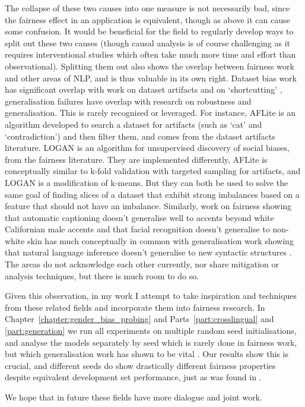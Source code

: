 The collapse of these two causes into one measure is not necessarily bad, since the fairness effect in an application is equivalent, though as above it can cause some confusion. It would be beneficial for the field to regularly develop ways to split out these two causes (though causal analysis is of course challenging as it requires interventional studies which often take much more time and effort than observational). Splitting them out also shows the overlap between fairness work and other areas of NLP, and is thus valuable in its own right. Dataset bias work has significant overlap with work on dataset artifacts and on `shortcutting' \citep{geirhos2020shortcut}, generalisation failures have overlap with research on robustness and generalisation. This is rarely recognised or leveraged. For instance, AFLite is an algorithm developed to search a dataset for artifacts (such as `cat' and `contradiction') \citep{LeBras2020AdversarialFO} and then filter them, and comes from the dataset artifacts literature. LOGAN \citep{zhao-chang-2020-logan} is an algorithm for unsupervised discovery of social biases, from the fairness literature. They are implemented differently, AFLite is conceptually similar to k-fold validation with targeted sampling for artifacts, and LOGAN is a modification of k-means. But they can both be used to solve the same goal of finding slices of a dataset that exhibit strong imbalances based on a feature that should not have an imbalance.  Similarly, work on fairness showing that automatic captioning doesn't generalise well to accents beyond white Californian male accents \citep{tatman17_interspeech} and that facial recognition doesn't generalise to non-white skin \citep{buolamwini18a} has much conceptually in common with generalisation work showing that natural language inference doesn't generalise to new syntactic structures \citep{mccoy-etal-2020-berts}. The areas do not acknowledge each other currently, nor share mitigation or analysis techniques, but there is much room to do so.

Given this observation, in my work I attempt to take inspiration and techniques from these related fields and incorporate them into fairness research. In Chapter~\ref{chapter:gender_bias_probing} and Parts~\ref{part:crosslingual} and \ref{part:generation} we run all experiments on multiple random seed initialisations, and analyse the models separately by seed which is rarely done in fairness work, but which generalisation work has shown to be vital \citep{mccoy-etal-2020-berts, multiberts}. Our results show this is crucial, and different seeds do show drastically different fairness properties despite equivalent development set performance, just as was found in \citep{mccoy-etal-2020-berts}.

We hope that in future these fields have more dialogue and joint work. 